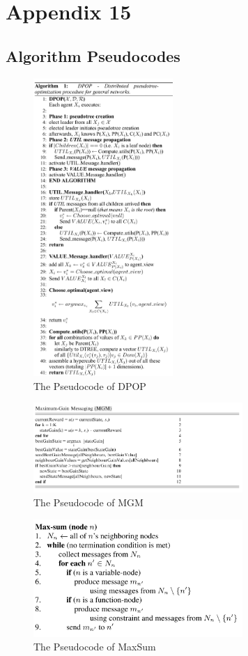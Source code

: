 \chapter{Appendix 15}
\label{a:appendix}

\section{Algorithm Pseudocodes}
\begin{figure}[h]
\includegraphics[width=200px]{graphics/dpop_ps}
\centering
\caption{The Pseudocode of DPOP}
\label{fig:dpopps}
\end{figure}
\begin{figure}[h]
\includegraphics[width=300px]{graphics/mgm_ps}
\centering
\caption{The Pseudocode of MGM}
\label{fig:mgmps}
\end{figure}
\begin{figure}[h]
\includegraphics[width=300px]{graphics/maxsum_ps}
\centering
\caption{The Pseudocode of MaxSum}
\label{fig:maxsumps}
\end{figure}

